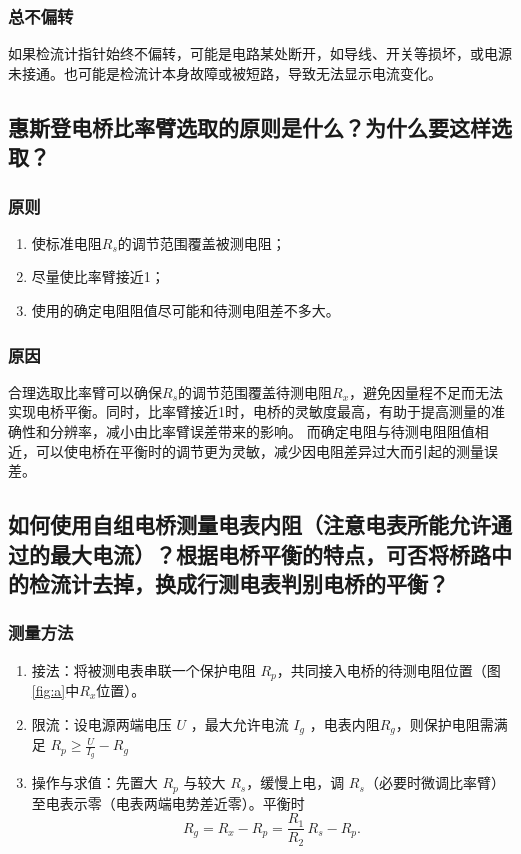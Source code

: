 \documentclass[]{../template/Report}%
\begin{document}
\begin{fullreportonly}
\subsubsection{总不偏转}
如果检流计指针始终不偏转，可能是电路某处断开，如导线、开关等损坏，或电源未接通。也可能是检流计本身故障或被短路，导致无法显示电流变化。

\subsection{惠斯登电桥比率臂选取的原则是什么？为什么要这样选取？}
\subsubsection{原则}
\begin{enumerate}
    \item 使标准电阻$R_s$的调节范围覆盖被测电阻；
    \item 尽量使比率臂接近1；
    \item 使用的确定电阻阻值尽可能和待测电阻差不多大。
\end{enumerate}
\subsubsection{原因}
合理选取比率臂可以确保$R_s$的调节范围覆盖待测电阻$R_x$，避免因量程不足而无法实现电桥平衡。同时，比率臂接近1时，电桥的灵敏度最高，有助于提高测量的准确性和分辨率，减小由比率臂误差带来的影响。
而确定电阻与待测电阻阻值相近，可以使电桥在平衡时的调节更为灵敏，减少因电阻差异过大而引起的测量误差。
\subsection{如何使用自组电桥测量电表内阻（注意电表所能允许通过的最大电流）？根据电桥平衡的特点，可否将桥路中的检流计去掉，换成行测电表判别电桥的平衡？}

\subsubsection{测量方法}
    \begin{enumerate}
      \item 接法：将被测电表串联一个保护电阻 $R_p$，共同接入电桥的待测电阻位置（图\ref{fig:a}中$R_x$位置）。
      \item 限流：设电源两端电压 $U$ ，最大允许电流 $I_g$ ，电表内阻$R_g$，则保护电阻需满足
      $ R_p \ge \frac{U}{I_g} - R_g$
      \item 操作与求值：先置大 $R_p$ 与较大 $R_s$，缓慢上电，调 $R_s$（必要时微调比率臂）至电表示零（电表两端电势差近零）。平衡时
      \[
        R_g = R_x- R_p = \frac{R_1}{R_2}\,R_s- R_p.
      \]
    \end{enumerate}


\end{fullreportonly}
\end{document}
